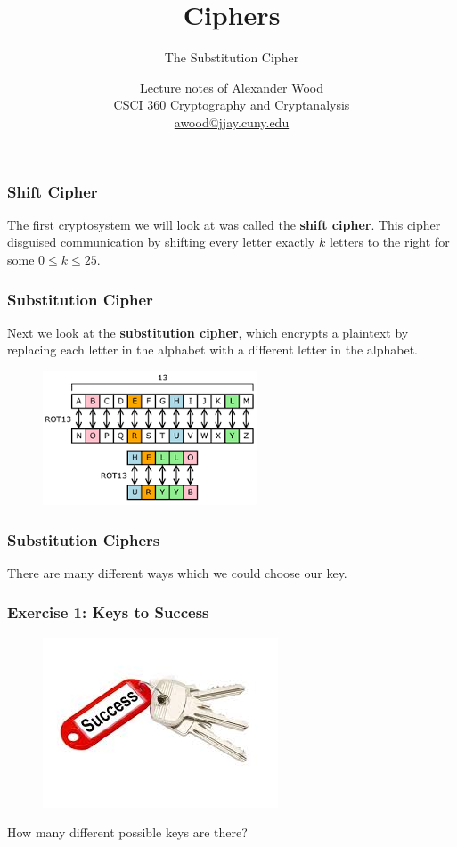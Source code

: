 \documentclass{beamer}
\title[CSCI360]{Ciphers}
\subtitle{The Substitution Cipher}
\author
{Lecture notes of Alexander Wood \\ CSCI 360 Cryptography and Cryptanalysis \\ \scriptsize \href{mailto:awood@jjay.cuny.edu}{awood@jjay.cuny.edu}}
\institute[JJay]{John Jay College of Criminal Justice}
\date{}
\newcommand{\<}{\langle}
\renewcommand{\>}{\rangle}
\begin{document}

\begin{frame}
  \titlepage
\end{frame}


\begin{frame}
\frametitle{Shift Cipher}

The first cryptosystem we will look at was called the \textbf{shift cipher}. This cipher disguised communication by shifting every letter exactly $k$ letters to the right for some $0 \le k \le 25$.
\end{frame}


\begin{frame}
\frametitle{Substitution Cipher}

Next we look at the \textbf{substitution cipher}, which encrypts a plaintext by replacing each letter in the alphabet with a different letter in the alphabet.
\begin{figure}
\includegraphics[scale=.8]{IMG/substitution.png}
\end{figure}
\end{frame}


\begin{frame}
\frametitle{Substitution Ciphers}

There are many different ways which we could choose our key. 
\end{frame}


\begin{frame}
\frametitle{Exercise 1: Keys to Success}

\begin{figure}
\includegraphics[scale=.7]{IMG/keys.jpeg}
\end{figure}
How many different possible keys are there?
\end{frame}
\end{document}
